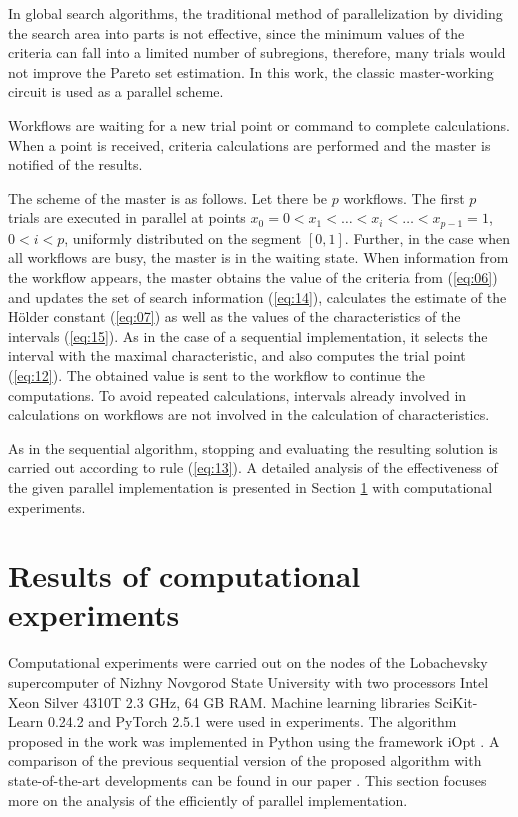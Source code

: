 \documentclass[runningheads]{llncs}
\begin{document}
In global search algorithms, the traditional method of parallelization by dividing the search area into parts is not effective, since the minimum values of the criteria can fall into a limited number of subregions, therefore, many trials would not improve the Pareto set estimation. 
In this work, the classic master-working circuit is used as a parallel scheme. 

Workflows are waiting for a new trial point or command to complete calculations. When a point is received, criteria calculations are performed and the master is notified of the results. 

The scheme of the master is as follows. Let there be $p$ workflows. The first $p$ trials are executed in parallel at points $x_0=0<x_1<\dots<x_i<\dots<x_{p-1}=1$, $0<i<p$, uniformly distributed on the segment $[0,1]$. Further, in the case when all workflows are busy, the master is in the waiting state. When information from the workflow appears, the master obtains the value of the criteria from (\ref{eq:06}) and updates the set of search information (\ref{eq:14}), calculates the estimate of the H{\" o}lder constant (\ref{eq:07}) as well as the values of the characteristics of the intervals (\ref{eq:15}). As in the case of a sequential implementation, it selects the interval with the maximal characteristic, and also computes the trial point (\ref{eq:12}). The obtained value is sent to the workflow to continue the computations. To avoid repeated calculations, intervals already involved in calculations on workflows are not involved in the calculation of characteristics.

As in the sequential algorithm, stopping and evaluating the resulting solution is carried out according to rule (\ref{eq:13}). A detailed analysis of the effectiveness of the given parallel implementation is presented in Section \ref{sec4} with computational experiments.


\section{Results of computational experiments}
\label{sec4}

Computational experiments were carried out on the nodes of the Lobachevsky supercomputer of Nizhny Novgorod State University with two processors Intel Xeon Silver 4310T 2.3 GHz, 64 GB RAM. Machine learning libraries SciKit-Learn 0.24.2 \cite{scikit-learn} and PyTorch 2.5.1 \cite{PyTorch} were used in experiments. The algorithm proposed in the work was implemented in Python using the framework iOpt \cite{ioptmco}. 
{\color{red}  A comparison of the previous sequential version of the proposed algorithm with state-of-the-art developments can be found in our paper \cite{Konnov2025}. This section focuses more on the analysis of the efficiently of parallel implementation.}
\end{document}
